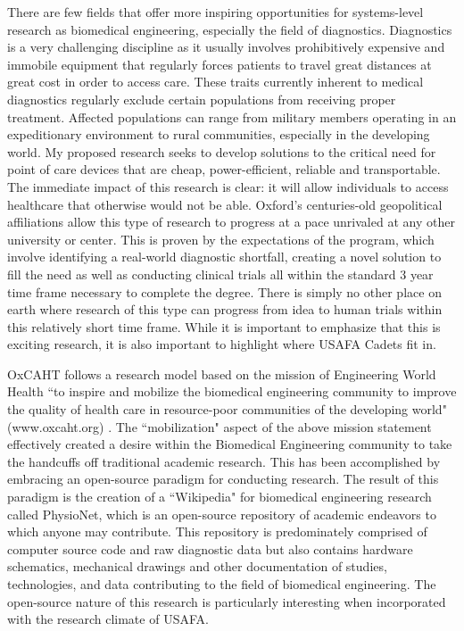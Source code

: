 \documentclass{article}
\begin{document}
There are few fields that offer more inspiring opportunities for systems-level 
research as biomedical engineering, especially the field of diagnostics.
Diagnostics is a very challenging discipline as it usually involves
prohibitively expensive and immobile equipment that regularly forces patients
to travel great distances at great cost in order to access care. These traits
currently inherent to medical diagnostics regularly exclude certain
populations from receiving proper
treatment. Affected populations can range from military members operating in an
expeditionary environment to rural communities, especially in the developing
world. My proposed research seeks to develop solutions to the critical need for
point of care devices that are cheap, power-efficient, reliable and
transportable. The immediate impact of this research is clear: it will allow
individuals to access healthcare that otherwise would not be able. Oxford's
centuries-old geopolitical affiliations allow this type of research to progress 
at a pace unrivaled at any other university or center. This is proven by the
expectations of the program, which involve identifying a real-world diagnostic 
shortfall, creating a novel solution to fill the need as well as conducting
clinical trials all within the standard 3 year time frame necessary to 
complete the degree. There is simply no other place on earth where research of
this type can progress from idea to human trials within this relatively short
time frame. While it is important to emphasize that this is exciting research,
it is also important to highlight where USAFA Cadets fit in.
 
OxCAHT follows a research model based on the mission of Engineering World
Health ``to inspire and mobilize the biomedical engineering community to improve
the quality of health care in resource-poor communities of the developing
world" (www.oxcaht.org) . The ``mobilization" aspect of the above mission
statement effectively created a desire within the Biomedical Engineering 
community to take the handcuffs off traditional academic research. This has
been accomplished by embracing an open-source paradigm for conducting research.
The result of this paradigm is the creation of a ``Wikipedia" for biomedical
engineering research called PhysioNet, which is an open-source repository of
academic endeavors to which anyone may contribute. This repository is
predominately comprised of computer source code and raw diagnostic data but
also contains hardware schematics, mechanical drawings and other documentation
of studies, technologies, and data contributing to the field of biomedical
engineering. The open-source nature of this research is particularly
interesting when incorporated with the research climate of USAFA.
 
\end{document}

